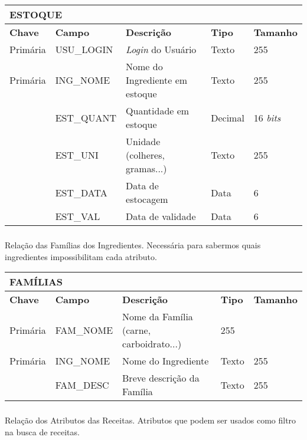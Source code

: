 \documentclass[paper=a4, fontsize=11pt]{scrartcl}	%
\numberwithin{equation}{section}															%
\numberwithin{figure}{section}																%
\numberwithin{table}{section}																%
\begin{document}
\begin{center}
\begin{tabular}{ l  l  l  l l }
  \multicolumn{5}{l}{\textbf{ESTOQUE}} \\
  \hline
  \textbf{Chave} & \textbf{Campo} & \textbf{Descrição} & \textbf{Tipo} & \textbf{Tamanho} \\
  \cline{1-5}
  Primária & USU\_LOGIN & \emph{Login} do Usuário & Texto & 255 \\
  Primária & ING\_NOME & Nome do Ingrediente em estoque & Texto & 255 \\
   & EST\_QUANT & Quantidade em estoque & Decimal & 16 \emph{bits} \\
   & EST\_UNI & Unidade (colheres, gramas...) & Texto & 255 \\
   & EST\_DATA & Data de estocagem & Data & 6 \\
   & EST\_VAL & Data de validade & Data & 6
\end{tabular}
\end{center}

\vfill

\subsubsection{} Relação das Famílias dos Ingredientes. Necessária para sabermos quais ingredientes impossibilitam cada atributo.

\begin{center}
\begin{tabular}{ l  l  l  l l }
  \multicolumn{5}{l}{\textbf{FAMÍLIAS}} \\
  \hline
  \textbf{Chave} & \textbf{Campo} & \textbf{Descrição} & \textbf{Tipo} & \textbf{Tamanho} \\
  \cline{1-5}
  Primária & FAM\_NOME & Nome da Família (carne, carboidrato...) & 255 \\
  Primária & ING\_NOME & Nome do Ingrediente & Texto & 255 \\
  & FAM\_DESC & Breve descrição da Família & Texto & 255
\end{tabular}
\end{center}

\newpage

\subsubsection{} Relação dos Atributos das Receitas. Atributos que podem ser usados como filtro na busca de receitas.
\end{document}

